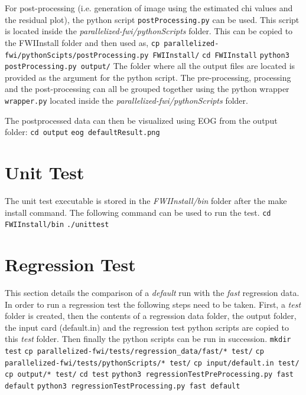 \documentclass[10pt]{article}
\begin{document}
\newpage
\noindent For post-processing (i.e. generation of image using the estimated chi values and the residual plot), the python script \texttt{postProcessing.py} can be used. This script is located inside the \textit{parallelized-fwi/pythonScripts} folder. This can be copied to the FWIInstall folder and then used as,
\newline
\texttt{cp parallelized-fwi/pythonScipts/postProcessing.py FWIInstall/}
\newline
\texttt{cd FWIInstall}
\newline
\texttt{python3 postProcessing.py output/}
\newline
The folder where all the output files are located is provided as the argument for the python script. The pre-processing, processing and the post-processing can all be grouped together using the python wrapper \texttt{wrapper.py} located inside the \textit{parallelized-fwi/pythonScripts} folder.

\noindent The postprocessed data can then be visualized using EOG from the output folder:
\newline
\texttt{cd output}
\newline
\texttt{eog defaultResult.png}
\newline
 
\section{Unit Test}

The unit test executable is stored in the \textit{FWIInstall/bin} folder after the make install command. The following command can be used to run the test.
\newline
\texttt{cd FWIInstall/bin}
\newline
\texttt{./unittest}


\section{Regression Test}

This section details the comparison of a \textit{default} run with the \textit{fast} regression data. In order to run a regression test the following steps need to be taken. First, a \textit{test} folder is created, then the contents of a regression data folder, the output folder, the input card (default.in) and the regression test python scripts are copied to this \textit{test} folder. Then finally the python scripts can be run in succession.  
\newline
\texttt{mkdir test}
\newline
\texttt{cp parallelized-fwi/tests/regression\_data/fast/* test/}
\newline
\texttt{cp parallelized-fwi/tests/pythonScripts/* test/}
\newline
\texttt{cp input/default.in test/}
\newline
\texttt{cp output/* test/}
\newline
\texttt{cd test}
\newline
\texttt{python3 regressionTestPreProcessing.py fast default}
\newline
\texttt{python3 regressionTestProcessing.py fast default}
\end{document}
